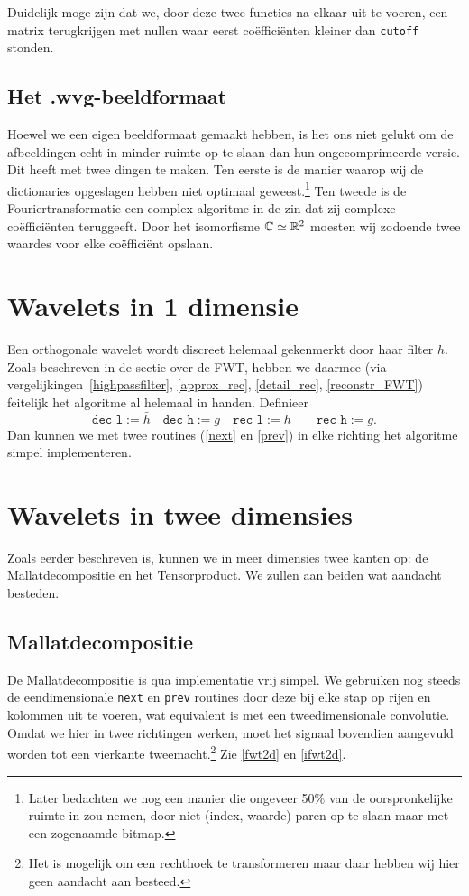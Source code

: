Duidelijk moge zijn dat we, door deze twee functies na elkaar uit te voeren, een matrix terugkrijgen met nullen waar eerst co\"effici\"enten kleiner dan \texttt{cutoff} stonden.

\subsection{Het .wvg-beeldformaat}
Hoewel we een eigen beeldformaat gemaakt hebben, is het ons niet gelukt om de afbeeldingen echt in minder ruimte op te slaan dan hun ongecomprimeerde versie. Dit heeft met twee dingen te maken. Ten eerste is de manier waarop wij de dictionaries opgeslagen hebben niet optimaal geweest.\footnote{Later bedachten we nog een manier die ongeveer 50\% van de oorspronkelijke ruimte in zou nemen, door niet (index, waarde)-paren op te slaan maar met een zogenaamde bitmap.} Ten tweede is de Fouriertransformatie een complex algoritme in de zin dat zij complexe co\"effici\"enten teruggeeft. Door het isomorfisme $\mathbb{C} \simeq \mathbb{R}^2$ moesten wij zodoende twee waardes voor elke co\"effici\"ent opslaan.

\section{Wavelets in 1 dimensie}
Een orthogonale wavelet wordt discreet helemaal gekenmerkt door haar filter $h$. Zoals beschreven in de sectie over de FWT, hebben we daarmee (via vergelijkingen~\ref{highpassfilter}, \ref{approx_rec}, \ref{detail_rec}, \ref{reconstr_FWT}) feitelijk het algoritme al helemaal in handen. Definieer
\[
	\texttt{dec\_l} := \bar{h} \quad \texttt{dec\_h} := \bar{g} \quad 
        \texttt{rec\_l} := h \quad \quad \texttt{rec\_h} := g.
\]
Dan kunnen we met twee routines (\autoref{next} en \autoref{prev}) in elke richting het algoritme simpel implementeren.

\section{Wavelets in twee dimensies}
Zoals eerder beschreven is, kunnen we in meer dimensies twee kanten op: de Mallatdecompositie en het Tensorproduct.
We zullen aan beiden wat aandacht besteden.

\subsection{Mallatdecompositie}
De Mallatdecompositie is qua implementatie vrij simpel. 
We gebruiken nog steeds de eendimensionale \texttt{next} en \texttt{prev} routines 
door deze bij elke stap op rijen en kolommen uit te voeren, wat equivalent is met een tweedimensionale convolutie.
Omdat we hier in twee richtingen werken, moet het signaal bovendien aangevuld worden tot een vierkante tweemacht.\footnote{Het is mogelijk om een rechthoek te transformeren maar daar hebben wij hier geen aandacht aan besteed.} Zie \autoref{fwt2d} en \autoref{ifwt2d}.


